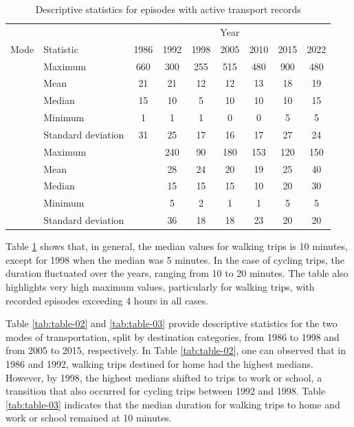 \documentclass[Royal,times,sageh]{sagej}
\begin{document}
\begin{longtable}[t]{>{}llccccccc}
\caption{\label{tab:table-01}\label{tab:table-01}Descriptive statistics for episodes with active transport records}\\
\toprule
\multicolumn{2}{c}{ } & \multicolumn{7}{c}{Year} \\
\cmidrule(l{3pt}r{3pt}){3-9}
Mode & Statistic & 1986 & 1992 & 1998 & 2005 & 2010 & 2015 & 2022\\
\midrule
 & Maximum & 660 & 300 & 255 & 515 & 480 & 900 & 480\\
\nopagebreak
 & Mean & 21 & 21 & 12 & 12 & 13 & 18 & 19\\
\nopagebreak
 & Median & 15 & 10 & 5 & 10 & 10 & 10 & 15\\
\nopagebreak
 & Minimum & 1 & 1 & 1 & 0 & 0 & 5 & 5\\
\nopagebreak
\multirow[t]{-5}{*}{\raggedright\arraybackslash \textbf{Walking}} & Standard deviation & 31 & 25 & 17 & 16 & 17 & 27 & 24\\
\cmidrule{1-9}\pagebreak[0]
 & Maximum &  & 240 & 90 & 180 & 153 & 120 & 150\\
\nopagebreak
 & Mean &  & 28 & 24 & 20 & 19 & 25 & 40\\
\nopagebreak
 & Median &  & 15 & 15 & 15 & 10 & 20 & 30\\
\nopagebreak
 & Minimum &  & 5 & 2 & 1 & 1 & 5 & 5\\
\nopagebreak
\multirow[t]{-5}{*}{\raggedright\arraybackslash \textbf{Cycling}} & Standard deviation &  & 36 & 18 & 18 & 23 & 20 & 20\\
\bottomrule
\end{longtable}
\endgroup{}

Table \ref{tab:table-01} shows that, in general, the median values for
walking trips is 10 minutes, except for 1998 when the median was 5
minutes. In the case of cycling trips, the duration fluctuated over the
years, ranging from 10 to 20 minutes. The table also highlights very
high maximum values, particularly for walking trips, with recorded
episodes exceeding 4 hours in all cases.

Table \ref{tab:table-02} and \ref{tab:table-03} provide descriptive
statistics for the two modes of transportation, split by destination
categories, from 1986 to 1998 and from 2005 to 2015, respectively. In
Table \ref{tab:table-02}, one can observed that in 1986 and 1992,
walking trips destined for home had the highest medians. However, by
1998, the highest medians shifted to trips to work or school, a
transition that also occurred for cycling trips between 1992 and 1998.
Table \ref{tab:table-03} indicates that the median duration for walking
trips to home and work or school remained at 10 minutes.
\end{document}
